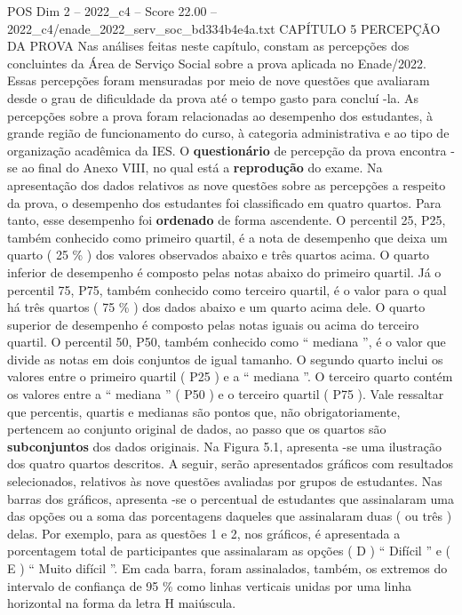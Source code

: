 \begin{textsample}{POS Dim 2 – 2022\_c4 – Score 22.00 – 2022\_c4/enade\_2022\_serv\_soc\_bd334b4e4a.txt}  \label{ex:f2_pos_022}
CAPÍTULO 5 PERCEPÇÃO DA PROVA Nas análises feitas neste capítulo, constam as percepções dos concluintes da Área de Serviço Social sobre a prova aplicada no Enade/2022.
Essas percepções foram mensuradas por meio de nove questões que avaliaram desde o grau de dificuldade da prova até o tempo gasto para concluí -la.
As percepções sobre a prova foram relacionadas ao desempenho dos estudantes, à grande região de funcionamento do curso, à categoria administrativa e ao tipo de organização acadêmica da IES.
O \textbf{questionário} de percepção da prova encontra -se ao final do Anexo VIII, no qual está a \textbf{reprodução} do exame.
Na apresentação dos dados relativos as nove questões sobre as percepções a respeito da prova, o desempenho dos estudantes foi classificado em quatro quartos.
Para tanto, esse desempenho foi \textbf{ordenado} de forma ascendente.
O percentil 25, P25, também conhecido como primeiro quartil, é a nota de desempenho que deixa um quarto ( 25 \% ) dos valores observados abaixo e três quartos acima.
O quarto inferior de desempenho é composto pelas notas abaixo do primeiro quartil.
Já o percentil 75, P75, também conhecido como terceiro quartil, é o valor para o qual há três quartos ( 75 \% ) dos dados abaixo e um quarto acima dele.
O quarto superior de desempenho é composto pelas notas iguais ou acima do terceiro quartil.
O percentil 50, P50, também conhecido como “ mediana ”, é o valor que divide as notas em dois conjuntos de igual tamanho.
O segundo quarto inclui os valores entre o primeiro quartil ( P25 ) e a “ mediana ”.
O terceiro quarto contém os valores entre a “ mediana ” ( P50 ) e o terceiro quartil ( P75 ).
Vale ressaltar que percentis, quartis e medianas são pontos que, não obrigatoriamente, pertencem ao conjunto original de dados, ao passo que os quartos são \textbf{subconjuntos} dos dados originais.
Na Figura 5.1, apresenta -se uma ilustração dos quatro quartos descritos.
A seguir, serão apresentados gráficos com resultados selecionados, relativos às nove questões avaliadas por grupos de estudantes.
Nas barras dos gráficos, apresenta -se o percentual de estudantes que assinalaram uma das opções ou a soma das porcentagens daqueles que assinalaram duas ( ou três ) delas.
Por exemplo, para as questões 1 e 2, nos gráficos, é apresentada a porcentagem total de participantes que assinalaram as opções ( D ) “ Difícil ” e ( E ) “ Muito difícil ”.
Em cada barra, foram assinalados, também, os extremos do intervalo de confiança de 95 \% como linhas verticais unidas por uma linha horizontal na forma da letra H maiúscula.

\end{textsample}
